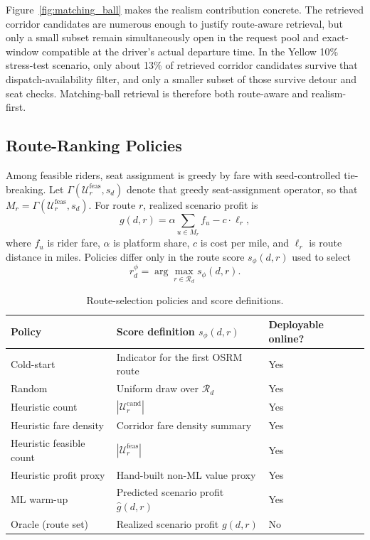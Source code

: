 \documentclass[journal]{IEEEtran}
\begin{document}
Figure~\ref{fig:matching_ball} makes the realism contribution concrete. The retrieved corridor candidates are numerous enough to justify route-aware retrieval, but only a small subset remain simultaneously open in the request pool and exact-window compatible at the driver's actual departure time. In the Yellow 10\% stress-test scenario, only about 13\% of retrieved corridor candidates survive that dispatch-availability filter, and only a smaller subset of those survive detour and seat checks. Matching-ball retrieval is therefore both route-aware and realism-first.

\subsection{Route-Ranking Policies}
Among feasible riders, seat assignment is greedy by fare with seed-controlled tie-breaking. Let \(\Gamma(\mathcal{U}_r^{\mathrm{feas}},s_d)\) denote that greedy seat-assignment operator, so that \(M_r=\Gamma(\mathcal{U}_r^{\mathrm{feas}},s_d)\). For route \(r\), realized scenario profit is
\[
g(d,r)= \alpha \sum_{u\in M_r}f_u - c\cdot \ell_r,
\]
where \(f_u\) is rider fare, \(\alpha\) is platform share, \(c\) is cost per mile, and \(\ell_r\) is route distance in miles. Policies differ only in the route score \(s_\phi(d,r)\) used to select
\[
r_d^\phi=\arg\max_{r\in\mathcal{R}_d}s_\phi(d,r).
\]

\begin{table}[!t]
\caption{Route-selection policies and score definitions.}
\label{tab:policy_definitions}
\centering
\footnotesize
\begin{tabularx}{\columnwidth}{L{0.24\columnwidth}Y L{0.18\columnwidth}}
\toprule
Policy & Score definition \(s_\phi(d,r)\) & Deployable online? \\
\midrule
Cold-start & Indicator for the first OSRM route & Yes \\
Random & Uniform draw over \(\mathcal{R}_d\) & Yes \\
Heuristic count & \(|\mathcal{U}_r^{\mathrm{cand}}|\) & Yes \\
Heuristic fare density & Corridor fare density summary & Yes \\
Heuristic feasible count & \(|\mathcal{U}_r^{\mathrm{feas}}|\) & Yes \\
Heuristic profit proxy & Hand-built non-ML value proxy & Yes \\
ML warm-up & Predicted scenario profit \(\hat g(d,r)\) & Yes \\
Oracle (route set) & Realized scenario profit \(g(d,r)\) & No \\
\bottomrule
\end{tabularx}
\end{table}
\end{document}

